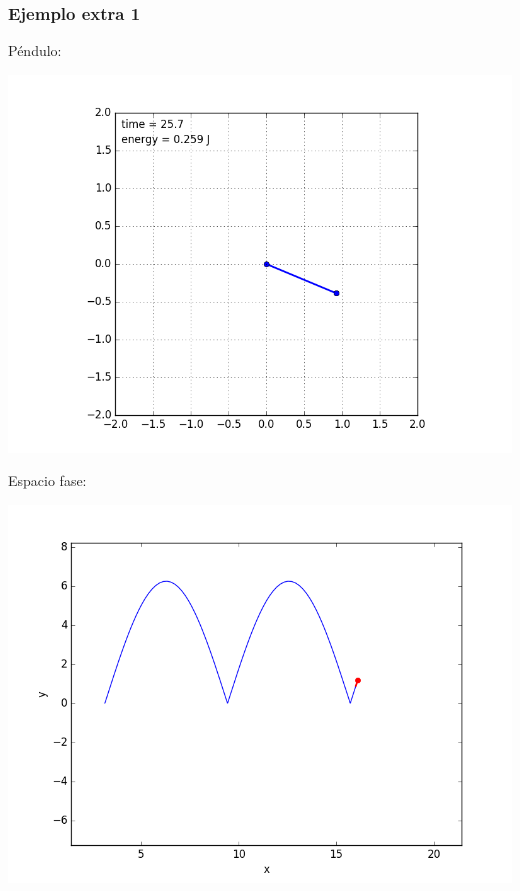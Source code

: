 \documentclass[12pt,letterpaper]{article}
\begin{document}
\subsubsection*{Ejemplo extra 1}
Péndulo:
\begin{center}
\includegraphics[scale=0.3]{E.png}
\end{center}
Espacio fase:
\begin{center}
\includegraphics[scale=0.3]{E1.png}
\end{center}
\end{document}
